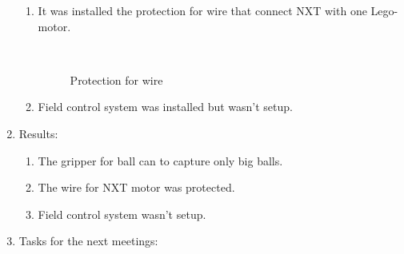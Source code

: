 \begin{enumerate}
\begin{enumerate}
		\item It was installed the protection for wire that connect NXT with one Lego-motor. 
		\begin{figure}[H]
			\begin{minipage}[h]{0.2\linewidth}
				\center  
			\end{minipage}
			\begin{minipage}[h]{0.6\linewidth}
				\caption{Protection for wire}
			\end{minipage}
		\end{figure}
		
        \item Field control system was installed but wasn't setup.

	\end{enumerate}
	
	\item Results:
	\begin{enumerate}
		
		\item The gripper for ball can to capture only big balls.
		
		\item The wire for NXT motor was protected.
		
        \item Field control system wasn't setup.
		
	\end{enumerate}
	
	\item Tasks for the next meetings:
	\begin{enumerate}
		

\end{enumerate}
\end{enumerate}
